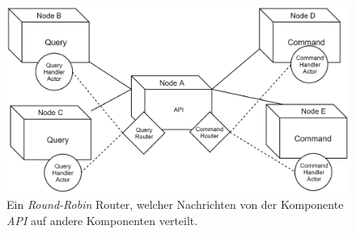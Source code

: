\begin{figure}
  \centering
  \includegraphics[width=\linewidth]{gfx/implementation/ClusterRouter}
  \caption{Ein \textit{Round-Robin} Router, welcher Nachrichten von der Komponente \textit{API} auf andere Komponenten verteilt.}
  \label{fig:implementation:routing}
\end{figure} 

